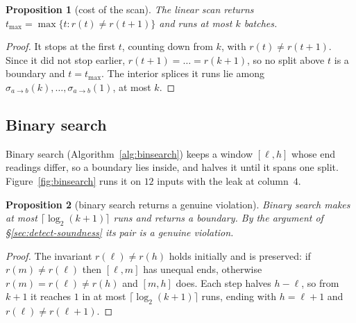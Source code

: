 \documentclass[letterpaper,twocolumn,10pt]{article}
\newtheorem{proposition}{Proposition}
\theoremstyle{definition}
\providecommand{\spl}[1]{\ensuremath{\sigma_{a\to b}(#1)}}
\providecommand{\tmax}{\ensuremath{t_{\max}}}
\newif\ifdraft \draftfalse
\newcommand{\todo}[1]{\ifdraft{\textcolor{red}{[\textbf{TODO:} #1]}}\fi}
\begin{document}
\begin{proposition}[cost of the scan]
\label{prop:scancost}
The linear scan returns $\tmax=\max\{t:r(t)\neq r(t+1)\}$ and runs at most $k$ batches.
\end{proposition}
\begin{proof}
\todo{should this be removed? moved to appendix? only explained?}
It stops at the first $t$, counting down from $k$, with $r(t)\neq r(t+1)$. Since it did
not stop earlier, $r(t+1)=\dots=r(k+1)$, so no split above $t$ is a boundary and
$t=\tmax$. The interior splices it runs lie among $\spl{k},\dots,\spl{1}$, at most $k$.
\end{proof}

\subsection{Binary search}
\label{app:binsearch}
Binary search (Algorithm~\ref{alg:binsearch}) keeps a window $[\ell,h]$ whose end
readings differ, so a boundary lies inside, and halves it until it spans one split.
Figure~\ref{fig:binsearch} runs it on $12$ inputs with the leak at column~$4$.



\begin{proposition}[binary search returns a genuine violation]
\label{prop:bsearch}
Binary search makes at most $\lceil\log_2(k+1)\rceil$ runs and returns a boundary. By
the argument of \S\ref{sec:detect-soundness} its pair is a genuine violation.
\end{proposition}
\begin{proof}
\todo{should this be removed? moved to appendix? only explained?}
The invariant $r(\ell)\neq r(h)$ holds initially and is preserved: if $r(m)\neq r(\ell)$
then $[\ell,m]$ has unequal ends, otherwise $r(m)=r(\ell)\neq r(h)$ and $[m,h]$ does.
Each step halves $h-\ell$, so from $k+1$ it reaches $1$ in at most
$\lceil\log_2(k+1)\rceil$ runs, ending with $h=\ell+1$ and $r(\ell)\neq r(\ell+1)$.
\end{proof}
\end{document}
